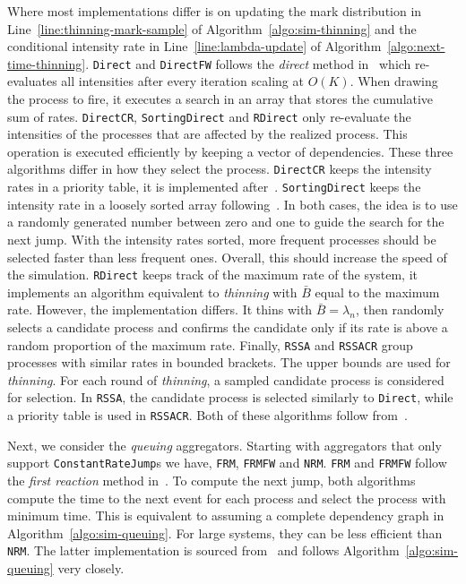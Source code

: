 \documentclass{juliacon}
\numberwithin{equation}{section}
\begin{document}
Where most implementations differ is on updating the mark distribution in Line~\ref{line:thinning-mark-sample} of Algorithm~\ref{algo:sim-thinning} and the conditional intensity rate in Line~\ref{line:lambda-update} of Algorithm~\ref{algo:next-time-thinning}. \texttt{Direct} and \texttt{DirectFW} follows the \textit{direct} method in~\cite{gillespie1976} which re-evaluates all intensities after every iteration scaling at \( O(K) \). When drawing the process to fire, it executes a search in an array that stores the cumulative sum of rates. \texttt{DirectCR}, \texttt{SortingDirect} and \texttt{RDirect} only re-evaluate the intensities of the processes that are affected by the realized process. This operation is executed efficiently by keeping a vector of dependencies. These three algorithms differ in how they select the process. \texttt{DirectCR} keeps the intensity rates in a priority table, it is implemented after~\cite{slepoy2008}. \texttt{SortingDirect} keeps the intensity rate in a loosely sorted array following~\cite{mccollum2006}. In both cases, the idea is to use a randomly generated number between zero and one to guide the search for the next jump. With the intensity rates sorted, more frequent processes should be selected faster than less frequent ones. Overall, this should increase the speed of the simulation. \texttt{RDirect} keeps track of the maximum rate of the system, it implements an algorithm equivalent to \textit{thinning} with \( \bar{B} \) equal to the maximum rate. However, the implementation differs. It thins with \( \bar{B} = \lambda_n \), then randomly selects a candidate process and confirms the candidate only if its rate is above a random proportion of the maximum rate. Finally, \texttt{RSSA} and \texttt{RSSACR} group processes with similar rates in bounded brackets. The upper bounds are used for \textit{thinning}. For each round of \textit{thinning}, a sampled candidate process is considered for selection. In \texttt{RSSA}, the candidate process is selected similarly to \texttt{Direct}, while a priority table is used in \texttt{RSSACR}. Both of these algorithms follow from~\cite{thanh2014,thanh2017}.

Next, we consider the \textit{queuing} aggregators. Starting with aggregators that only support \texttt{ConstantRateJump}s we have, \texttt{FRM}, \texttt{FRMFW} and \texttt{NRM}. \texttt{FRM} and \texttt{FRMFW} follow the \textit{first reaction} method in~\cite{gillespie1976}. To compute the next jump, both algorithms compute the time to the next event for each process and select the process with minimum time. This is equivalent to assuming a complete dependency graph in Algorithm~\ref{algo:sim-queuing}. For large systems, they can be less efficient than \texttt{NRM}. The latter implementation is sourced from~\cite{gibson2000} and follows Algorithm~\ref{algo:sim-queuing} very closely.
\end{document}
